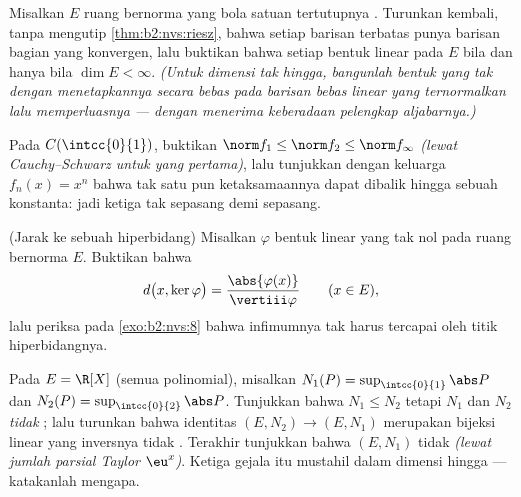 \begin{exercise}[$\star\star\star$]\label{exo:b2:nvs:9}
Misalkan $E$ ruang bernorma yang bola satuan tertutupnya .
Turunkan kembali, tanpa mengutip \cref{thm:b2:nvs:riesz}, bahwa setiap
barisan terbatas punya barisan bagian yang konvergen, lalu buktikan bahwa
setiap bentuk linear pada $E$  bila dan hanya bila $\dim E <
\infty$. \emph{(Untuk dimensi tak hingga, bangunlah bentuk yang tak
 dengan menetapkannya secara bebas pada barisan bebas linear yang
ternormalkan lalu memperluasnya --- dengan menerima keberadaan pelengkap
aljabarnya.)}
\end{exercise}

\begin{exercise}[$\star\star$]\label{exo:b2:nvs:10}
Pada $C(\intcc{0}{1})$, buktikan $\norm f_1 \leq \norm f_2 \leq \norm
f_\infty$ \emph{(lewat Cauchy--Schwarz untuk yang pertama)}, lalu
tunjukkan dengan keluarga $f_n(x) = x^n$ bahwa tak satu pun
ketaksamaannya dapat dibalik hingga sebuah konstanta: jadi ketiga
 tak  sepasang demi sepasang.
\end{exercise}

\begin{exercise}[$\star\star$]\label{exo:b2:nvs:11}
(Jarak ke sebuah hiperbidang) Misalkan $\varphi$ bentuk linear 
yang tak nol pada ruang bernorma $E$. Buktikan bahwa
\[
d\bigl(x, \ker\varphi\bigr) =
\frac{\abs{\varphi(x)}}{\vertiii\varphi}
\qquad (x \in E),
\]
lalu periksa pada \cref{exo:b2:nvs:8} bahwa infimumnya tak harus
tercapai oleh titik hiperbidangnya.
\end{exercise}

\begin{exercise}[$\star\star\star$]\label{exo:b2:nvs:12}
Pada $E = \R[X]$ (semua polinomial), misalkan $N_1(P) =
\sup_{\intcc{0}{1}}\abs P$ dan $N_2(P) =
\sup_{\intcc{0}{2}}\abs P$. Tunjukkan bahwa $N_1 \leq N_2$ tetapi
$N_1$ dan $N_2$ \emph{tidak} ; lalu turunkan bahwa
identitas $(E, N_2) \to (E, N_1)$ merupakan bijeksi linear 
yang inversnya tidak . Terakhir tunjukkan bahwa $(E, N_1)$
tidak  \emph{(lewat jumlah parsial Taylor $\eu^x$)}. Ketiga
gejala itu mustahil dalam dimensi hingga --- katakanlah mengapa.
\end{exercise}

